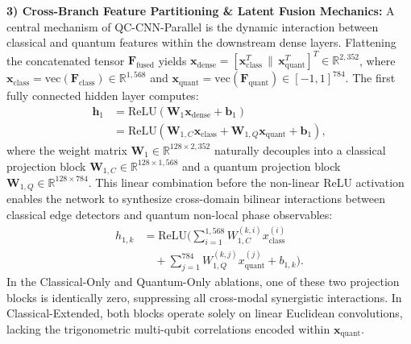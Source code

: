 \documentclass[journal]{IEEEtran}
\begin{document}
\textbf{3) Cross-Branch Feature Partitioning \& Latent Fusion Mechanics:}
A central mechanism of QC-CNN-Parallel is the dynamic interaction between classical and quantum features within the downstream dense layers. Flattening the concatenated tensor $\mathbf{F}_{\mathrm{fused}}$ yields $\mathbf{x}_{\mathrm{dense}} = [\mathbf{x}_{\mathrm{class}}^T \,\|\, \mathbf{x}_{\mathrm{quant}}^T]^T \in \mathbb{R}^{2{,}352}$, where $\mathbf{x}_{\mathrm{class}} = \mathrm{vec}(\mathbf{F}_{\mathrm{class}}) \in \mathbb{R}^{1{,}568}$ and $\mathbf{x}_{\mathrm{quant}} = \mathrm{vec}(\mathbf{F}_{\mathrm{quant}}) \in [-1, 1]^{784}$. The first fully connected hidden layer computes:
\begin{align}
\mathbf{h}_1 &= \mathrm{ReLU}\left( \mathbf{W}_1 \mathbf{x}_{\mathrm{dense}} + \mathbf{b}_1 \right) \nonumber \\
&= \mathrm{ReLU}\left( \mathbf{W}_{1,C} \mathbf{x}_{\mathrm{class}} + \mathbf{W}_{1,Q} \mathbf{x}_{\mathrm{quant}} + \mathbf{b}_1 \right),
\label{eq:ablation_dense_partition}
\end{align}
where the weight matrix $\mathbf{W}_1 \in \mathbb{R}^{128 \times 2{,}352}$ naturally decouples into a classical projection block $\mathbf{W}_{1,C} \in \mathbb{R}^{128 \times 1{,}568}$ and a quantum projection block $\mathbf{W}_{1,Q} \in \mathbb{R}^{128 \times 784}$. This linear combination before the non-linear ReLU activation enables the network to synthesize cross-domain bilinear interactions between classical edge detectors and quantum non-local phase observables:
\begin{align}
h_{1,k} &= \mathrm{ReLU}\Bigg( \sum_{i=1}^{1{,}568} W_{1,C}^{(k,i)} x_{\mathrm{class}}^{(i)} \nonumber \\
&\quad + \sum_{j=1}^{784} W_{1,Q}^{(k,j)} x_{\mathrm{quant}}^{(j)} + b_{1,k} \Bigg).
\label{eq:neuron_level_fusion}
\end{align}
In the Classical-Only and Quantum-Only ablations, one of these two projection blocks is identically zero, suppressing all cross-modal synergistic interactions. In Classical-Extended, both blocks operate solely on linear Euclidean convolutions, lacking the trigonometric multi-qubit correlations encoded within $\mathbf{x}_{\mathrm{quant}}$.
\end{document}

